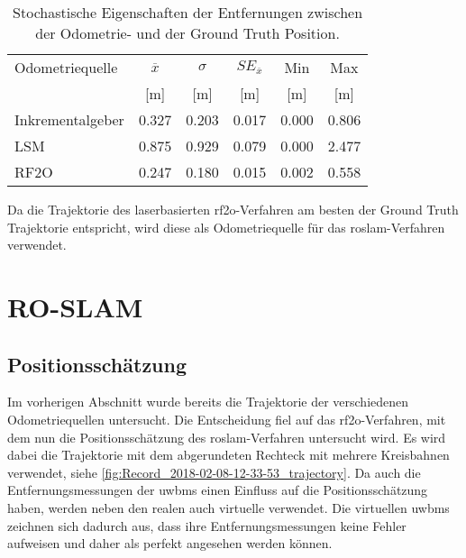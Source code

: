 \begin{table}
	\centering
	\begin{tabular}{||l||c|c|c||c|c||}
		\hline
		Odometriequelle & $\overline{x}$ & $\sigma$ & $SE_{\overline{x}}$ & Min & Max \\
		& [\si{\meter}] & [\si{\meter}] & [\si{\meter}] & [\si{\meter}] & [\si{\meter}] \\
		\hline
		\hline
		Inkrementalgeber & \num{0.327} & \num{0.203} & \num{0.017} & \num{0.000} & \num{0.806} \\
		LSM & \num{0.875} & \num{0.929} & \num{0.079} & \num{0.000} & \num{2.477} \\
		RF2O & \num{0.247} & \num{0.180} & \num{0.015} & \num{0.002} & \num{0.558} \\
		\hline
	\end{tabular}
	\caption{Stochastische Eigenschaften der Entfernungen zwischen der Odometrie- und der Ground Truth Position.}
	\label{tab:stochastik_odometrie_quellen}
\end{table}

Da die Trajektorie des laserbasierten \gls{rf2o}-Verfahren am besten der Ground Truth Trajektorie entspricht, wird diese als Odometriequelle für das \gls{roslam}-Verfahren verwendet.


%
%
%
\section{RO-SLAM}


%
%
\subsection{Positionsschätzung}

Im vorherigen Abschnitt wurde bereits die Trajektorie der verschiedenen Odometriequellen untersucht. Die Entscheidung fiel auf das \gls{rf2o}-Verfahren, mit dem nun die Positionsschätzung des \gls{roslam}-Verfahren untersucht wird. Es wird dabei die Trajektorie mit dem abgerundeten Rechteck mit mehrere Kreisbahnen verwendet, siehe \autoref{fig:Record_2018-02-08-12-33-53_trajectory}. Da auch die Entfernungsmessungen der \glspl{uwbm} einen Einfluss auf die Positionsschätzung haben, werden neben den realen auch virtuelle  verwendet. Die virtuellen \glspl{uwbm} zeichnen sich dadurch aus, dass ihre Entfernungsmessungen keine Fehler aufweisen und daher als perfekt angesehen werden können.

